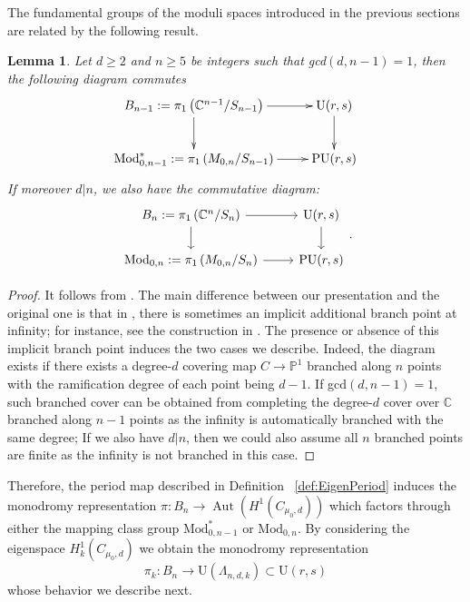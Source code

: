 \documentclass[12pt, letterpaper]{amsart}
\theoremstyle{plain}
\newtheorem{lemma}[theorem]{Lemma}
\theoremstyle{definition}
\begin{document}
The fundamental groups of the moduli spaces introduced in the previous sections are related by the following result.
\begin{lemma}
\label{lemma:FundGroups}
Let $d \geq 2$ and $n \geq 5$ be integers such that gcd$(d,n-1)=1$, then the following diagram commutes
\[
\xymatrix{ 
B_{n-1}:=\pi_{1}\left( \mathbb{C}^{n-1}/S_{n-1} \right)
\ar[d] \ar[r] 
& \mathrm{U}(r,s) \ar[d] \\
\mathrm{Mod}^*_{0,n-1}
:= \pi_1\left(
M_{0,n}/S_{n-1}
\right)
\ar[r]
&  \mathrm{PU}(r,s)
}
\]
If moreover $d | n$, we also have the commutative diagram:
\[
\begin{tikzcd}
B_n:= \pi_1\left( \mathbb{C}^n/S_n \right) \arrow[r] \arrow[d]
& \mathrm{U}(r,s) \arrow[d] \\
\mathrm{Mod}_{0,n} 
:= \pi_1\left(
M_{0,n}/S_n
\right)
\arrow[r]
&  \mathrm{PU}(r,s)
\end{tikzcd}.
\]
\end{lemma}
\begin{proof}
It follows from \cite[(2.5)]{McM13}. The main difference between our presentation and the original one is that in \cite{McM13}, there is sometimes an implicit additional branch point at infinity; for instance, see the construction in \cite[8.5]{McM13}. The presence or absence of this implicit branch point induces the two cases we describe.  Indeed, the diagram exists if there exists a degree-$d$ covering map $C\rightarrow \mathbb{P}^1$ branched along $n$ points with the ramification degree of each point being $d-1$. If gcd$(d,n-1)=1$, such branched cover can be obtained from completing the degree-$d$ cover over $\mathbb{C}$ branched along $n-1$ points as the infinity is automatically branched with the same degree; If we also have $d|n$, then we could also assume all $n$ branched points are finite as the infinity is not branched in this case.
\end{proof}
Therefore, the period map described in 
Definition ~\ref{def:EigenPeriod} induces the  monodromy representation 
$
\pi: B_n 
\longrightarrow
\operatorname{Aut}(H^1(C_{\mu_0, d}))
$
which factors through either the mapping class group 
$\mathrm{Mod}^{*}_{0,n-1}$ or 
$\mathrm{Mod}_{0,n}$.
 By considering the eigenspace $H^1_k(C_{\mu_0, d})$ we obtain the monodromy representation
$$
\pi_k: B_n 
\longrightarrow \mathrm{U}(\Lambda_{n,d,k}) \subset \mathrm{U}(r,s)
$$
whose behavior we describe next. 
\end{document}

